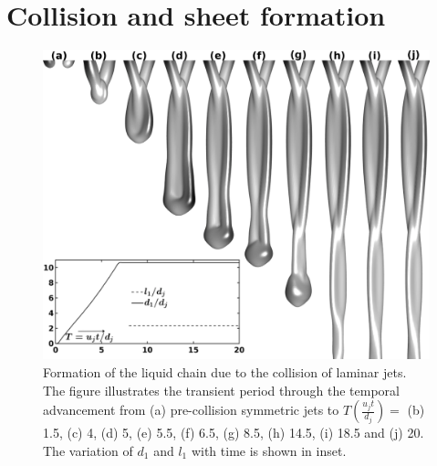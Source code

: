 \documentclass[%
 aip,
 sd,%
amsmath,amssymb,
preprint,%
author-year,%
]{revtex4-1}
\begin{document}
\section{Collision and sheet formation}
\begin{figure}
	\centering
	\includegraphics[width=\linewidth]{Figure4}
	\caption{Formation of the liquid chain due to the collision of laminar jets. The figure illustrates the transient period through the temporal advancement from (a) pre-collision symmetric jets to $T (\frac{u_jt}{d_j}) = $ (b) 1.5, (c) 4, (d) 5, (e) 5.5, (f) 6.5, (g) 8.5, (h) 14.5, (i) 18.5  and (j) 20. The variation of $d_1$ and $l_1$ with time is shown in inset.}
	\label{Figure::temporal}
\end{figure}
\end{document}
